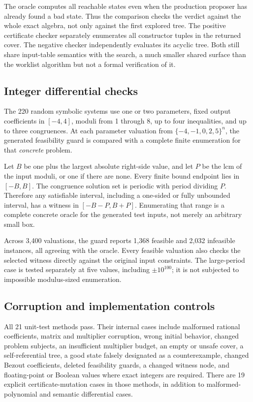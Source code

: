 The oracle computes all reachable states even when the production proposer has
already found a bad state. Thus the comparison checks the verdict against the
whole exact algebra, not only against the first explored tree. The positive
certificate checker separately enumerates all constructor tuples in the
returned cover. The negative checker independently evaluates its acyclic tree.
Both still share input-table semantics with the search, a much smaller shared
surface than the worklist algorithm but not a formal verification of it.

\subsection{Integer differential checks}
The 220 random symbolic systems use one or two parameters, fixed output
coefficients in $[-4,4]$, moduli from 1 through 8, up to four inequalities, and
up to three congruences. At each parameter valuation from
$\{-4,-1,0,2,5\}^n$, the generated feasibility guard is compared with a complete
finite enumeration for that \emph{concrete} problem.

Let $B$ be one plus the largest absolute right-side value, and let $P$ be the
lcm of the input moduli, or one if there are none. Every finite bound endpoint
lies in $[-B,B]$. The congruence solution set is periodic with period dividing
$P$. Therefore any satisfiable interval, including a one-sided or fully
unbounded interval, has a witness in $[-B-P,B+P]$. Enumerating that range is a
complete concrete oracle for the generated test inputs, not merely an arbitrary
small box.

Across 3,400 valuations, the guard reports 1,368 feasible and 2,032 infeasible
instances, all agreeing with the oracle. Every feasible valuation also checks
the selected witness directly against the original input constraints. The
large-period case is tested separately at five values, including
$\pm10^{100}$; it is not subjected to impossible modulus-sized enumeration.

\subsection{Corruption and implementation controls}
All 21 unit-test methods pass. Their internal cases include malformed rational
coefficients, matrix and multiplier corruption, wrong initial behavior, changed
problem subjects, an insufficient multiplier budget, an empty or unsafe cover,
a self-referential tree, a good state falsely designated as a counterexample,
changed Bezout coefficients, deleted feasibility guards, a changed witness node,
and floating-point or Boolean values where exact integers are required.
There are 19 explicit certificate-mutation cases in those methods, in addition
to malformed-polynomial and semantic differential cases.

